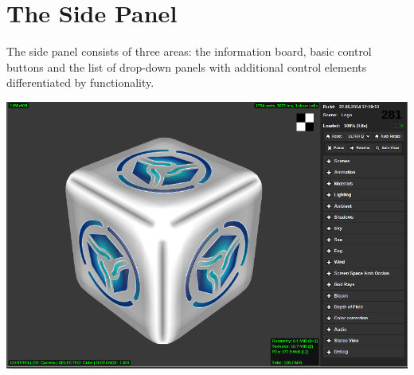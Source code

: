 \documentclass[a4paper,12pt,oneside]{sphinxmanual}
\begin{document}
\section{The Side Panel}
\label{viewer:id3}
The side panel consists of three areas: the information board, basic control buttons and the list of drop-down panels with additional control elements differentiated by functionality.

{\hfill\includegraphics[width=1.000\linewidth]{default_page.jpg}\hfill}

\begin{DUlineblock}{0em}
\item[] 
\end{DUlineblock}
\end{document}
